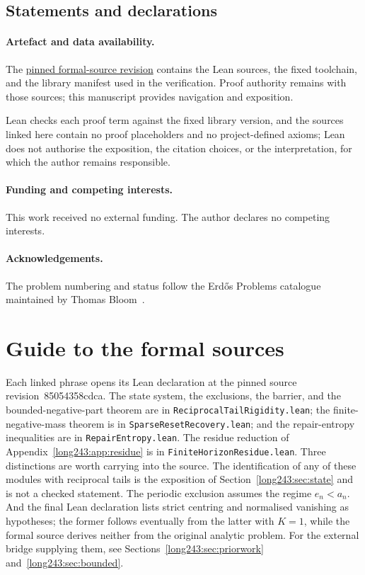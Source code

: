 \documentclass[11pt]{article}
\renewcommand{\commitshort}{85054358cdca}
\begin{document}
\subsection*{Statements and declarations}

\paragraph{Artefact and data availability.} The
\href{\sourceurl}{pinned formal-source revision} contains the Lean sources, the
fixed toolchain, and the library manifest used in the verification.  Proof
authority remains with those sources; this manuscript provides navigation and
exposition.

Lean checks each proof term against the fixed library
version, and the sources linked here contain no proof placeholders and no
project-defined axioms; Lean does not authorise the exposition, the citation
choices, or the interpretation, for which the author remains responsible.

\paragraph{Funding and competing interests.} This work received no external
funding.  The author declares no competing interests.

\paragraph{Acknowledgements.} The problem numbering and status follow the
Erd\H{o}s Problems catalogue maintained by Thomas Bloom~\cite{erdosproblems}.

\appendix
\section{Guide to the formal sources}\label{long243:app:index}

Each linked phrase opens its Lean declaration at the pinned source
revision~\commitshort.  The state system, the exclusions, the barrier, and the
bounded-negative-part theorem are in \texttt{ReciprocalTailRigidity.lean}; the
finite-negative-mass theorem is in \texttt{SparseResetRecovery.lean}; and the
repair-entropy inequalities are in \texttt{RepairEntropy.lean}.  The residue
reduction of Appendix~\ref{long243:app:residue} is in
\texttt{FiniteHorizonResidue.lean}.  Three distinctions are worth carrying into
the source.  The
identification of any of these modules with reciprocal tails is the exposition
of Section~\ref{long243:sec:state} and is not a checked statement.  The periodic exclusion
assumes the regime $e_n<a_n$.  And the final Lean declaration lists strict
centring and normalised vanishing as hypotheses; the former follows eventually
from the latter with $K=1$, while the formal source derives neither from the
original analytic problem.  For the external bridge supplying them,
see Sections~\ref{long243:sec:priorwork} and~\ref{long243:sec:bounded}.
\end{document}
